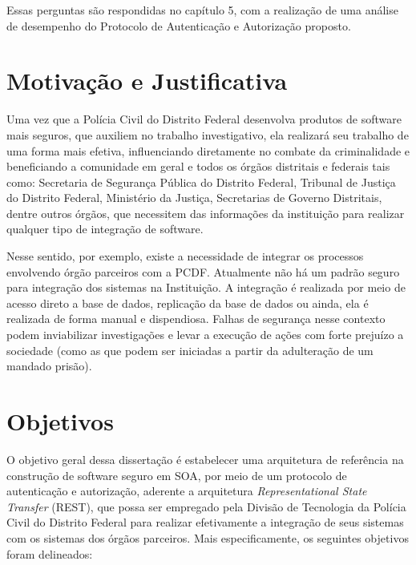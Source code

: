 Essas perguntas são respondidas no capítulo 5, com a realização de uma análise de desempenho do Protocolo de Autenticação e Autorização proposto.


\section{Motivação e Justificativa}

Uma vez que a Polícia Civil do Distrito Federal desenvolva produtos de software mais seguros, que auxiliem no trabalho investigativo, ela realizará seu trabalho de uma forma mais efetiva, influenciando diretamente no combate da criminalidade e beneficiando a comunidade em geral e todos os órgãos distritais e federais tais como: Secretaria de Segurança Pública do Distrito Federal, Tribunal de Justiça do Distrito Federal, Ministério da Justiça, Secretarias de Governo Distritais, dentre outros órgãos, que necessitem das informações da instituição para realizar qualquer tipo de integração de software.

Nesse sentido, por exemplo, existe a necessidade de integrar os processos envolvendo \'{o}rg\~{a}o parceiros com a PCDF. Atualmente não há um padrão seguro para integração dos sistemas na Instituição. A integração é realizada por meio de acesso direto a base de dados, replicação da base de dados ou ainda, ela é realizada de forma manual e dispendiosa. Falhas de seguran\c ca nesse contexto podem inviabilizar investiga\c c\~{o}es e levar a execu\c c\~{a}o de a\c c\~{o}es com forte prejuízo a sociedade (como as que podem ser iniciadas a partir da adultera\c c\~{a}o de um mandado pris\~{a}o).


\section{Objetivos}\label{sec:Obj}

O objetivo geral dessa dissertação é estabelecer uma arquitetura de referência na construção de software seguro em SOA, por meio de um protocolo de autenticação e autorização, aderente a arquitetura \emph{Representational State Transfer} (REST), que possa ser empregado pela Divisão de Tecnologia da Polícia Civil do Distrito Federal para realizar efetivamente a integração de seus sistemas com os sistemas dos órgãos parceiros. Mais especificamente, os seguintes objetivos foram delineados:

